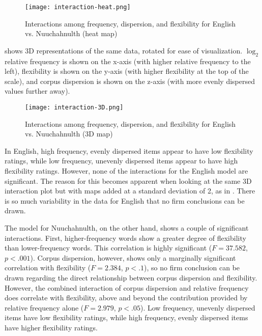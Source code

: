 \begin{figure}
  \centering
  \caption{Interactions among frequency, dispersion, and flexibility for English vs. Nuuchahnulth (heat map)}
  \label{fig:interaction-heat}
  \texttt{[image: interaction-heat.png]}
\end{figure}

 shows 3D representations of the same data, rotated for ease of visualization. $\log_2$ relative frequency is shown on the x-axis (with higher relative frequency to the left), flexibility is shown on the y-axis (with higher flexibility at the top of the scale), and corpus dispersion is shown on the z-axis (with more evenly dispersed values further away).

\begin{figure}
  \centering
  \caption{Interactions among frequency, dispersion, and flexibility for English vs. Nuuchahnulth (3D map)}
  \label{fig:interaction-3D}
  \texttt{[image: interaction-3D.png]}
\end{figure}

In English, high frequency, evenly dispersed items appear to have low flexibility ratings, while low frequency, unevenly dispersed items appear to have high flexibility ratings. However, none of the interactions for the English model are significant. The reason for this becomes apparent when looking at the same 3D interaction plot but with maps added at a standard deviation of 2, as in . There is so much variability in the data for English that no firm conclusions can be drawn.

The model for Nuuchahnulth, on the other hand, shows a couple of significant interactions. First, higher-frequency words show a greater degree of flexibility than lower-frequency words. This correlation is highly significant ($F = 37.582$, $p < .001$). Corpus dispersion, however, shows only a marginally significant correlation with flexibility ($F = 2.384$, $p < .1$), so no firm conclusion can be drawn regarding the direct relationship between corpus dispersion and flexibility. However, the combined interaction of corpus dispersion and relative frequency does correlate with flexibility, above and beyond the contribution provided by relative frequency alone ($F = 2.979$, $p < .05$). Low frequency, unevenly dispersed items have low flexibility ratings, while high frequency, evenly dispersed items have higher flexibility ratings.

